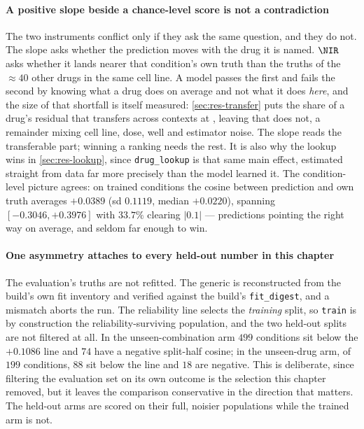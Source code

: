 \paragraph{A positive slope beside a chance-level score is not a contradiction}
The two instruments conflict only if they ask the same question, and they do not.
The slope asks whether the prediction moves with the drug it is named. $\NIR$ asks
whether it lands nearer that condition's own truth than the truths of the
$\approx 40$ other drugs in the same cell line. A model passes the first and fails
the second by knowing what a drug does on average and not what it does
\emph{here}, and the size of that shortfall is itself measured:
\cref{sec:res-transfer} puts the share of a drug's residual that transfers across
contexts at , leaving
 that does not, a remainder mixing cell line, dose,
well and estimator noise. The slope reads the transferable part; winning a ranking
needs the rest. It is also why the lookup wins in \cref{sec:res-lookup}, since
\texttt{drug\_lookup} is that same main effect, estimated straight from data far
more precisely than the model learned it. The condition-level picture agrees: on
trained conditions the cosine between prediction and own truth averages $+0.0389$
(sd $0.1119$, median $+0.0220$), spanning $[-0.3046, +0.3976]$ with $33.7\%$
clearing $|0.1|$ --- predictions pointing the right way on average, and seldom far
enough to win.

\paragraph{One asymmetry attaches to every held-out number in this chapter} The
evaluation's truths are not refitted. The generic is reconstructed from the
build's own fit inventory and verified against the build's \texttt{fit\_digest},
and a mismatch aborts the run. The reliability line selects the \emph{training}
split, so \texttt{train} is by construction the reliability-surviving population,
and the two held-out splits are not filtered at all. In the unseen-combination
arm $\num{499}$ conditions sit below the $+0.1086$ line and $\num{74}$ have a
negative split-half cosine; in the unseen-drug arm, of $\num{199}$ conditions,
$\num{88}$ sit below the line and $\num{18}$ are negative. This is deliberate,
since filtering the evaluation set on its own outcome is the selection this
chapter removed, but it leaves the comparison conservative in the direction that
matters. The held-out arms are scored on their full, noisier populations while
the trained arm is not.

